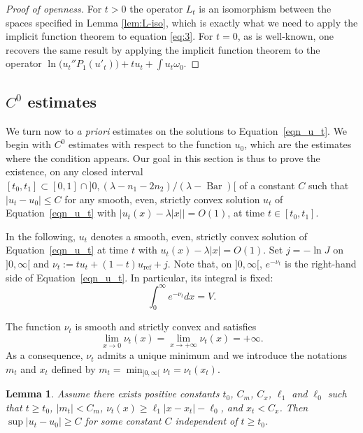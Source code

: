 \documentclass[10pt]{amsart}
\theoremstyle{plain}
\newtheorem{lem}[thm]{Lemma}
\theoremstyle{definition}
\DeclareMathOperator{\barDH}{Bar}
\begin{document}
\begin{proof}[Proof of openness]
For $t>0$ the operator $L_t$ is an isomorphism between the spaces specified in Lemma \ref{lem:L-iso}, which is exactly what we need to apply the implicit function theorem to equation \eqref{eq:3}. For $t=0$, as is well-known, one recovers the same result by applying the implicit function theorem to the operator $\ln \big( u_t''P_1(u'_t) \big) + t u_t + \int u_t\omega_0$.
\end{proof}

\subsection{$C^0$ estimates}

We turn now to \emph{a priori} estimates on the solutions to Equation~\eqref{eqn_u_t}.
We begin with $C^0$ estimates with respect to the function $u_0$,
which are the estimates where the condition appears.
Our goal in this section is thus to prove the existence,
on any closed interval $[t_0,t_1]\subset [0,1]\cap{} ]0,(\lambda-n_1-2n_2)/(\lambda-\barDH)[$
of a constant $C$ such that
$|u_t-u_0|\leq C$ for any smooth, even, strictly convex solution $u_t$ of
Equation~\eqref{eqn_u_t} with $|u_t(x)-\lambda|x||=O(1)$, at time $t\in [t_0,t_1]$.

In the following, $u_t$ denotes a smooth, even, strictly convex solution of
Equation~\eqref{eqn_u_t} at time $t$ with $u_t(x)-\lambda|x|=O(1)$.
Set $j=-\ln J$ on $]0,\infty[$ and
$ \nu_t:=tu_t+(1-t)u_{\mathrm{ref}}+j $.
Note that, on $]0,\infty[$, $e^{-\nu_t}$ is the right-hand side of Equation~\eqref{eqn_u_t}.
In particular, its integral is fixed:
\begin{equation}
\int_0^{\infty} e^{-\nu_t} dx= V.
\end{equation}

The function $\nu_t$ is smooth and strictly
convex and satisfies
$$\lim_{x\to 0}\nu_t(x)=
\lim_{x\to +\infty}\nu_t(x)=+\infty.$$
As a consequence, $\nu_t$ admits a unique minimum and we introduce
the notations $m_t$ and $x_t$ defined by
$m_t=\min_{]0,\infty[}\nu_t=\nu_t(x_t)$.


\begin{lem}
\label{lem_reduction}
Assume there exists positive constants $t_0$, $C_m$, $C_x$, $\ell_1$ and $\ell_0$
such that $t\geq t_0$, $|m_t|<C_m$, $\nu_t(x)\geq \ell_1|x-x_t|-\ell_0$, and $x_t<C_x$.
Then $\sup |u_t-u_0|\geq C$
for some constant $C$ independent of $t\geq t_0$.
\end{lem}
\end{document}
